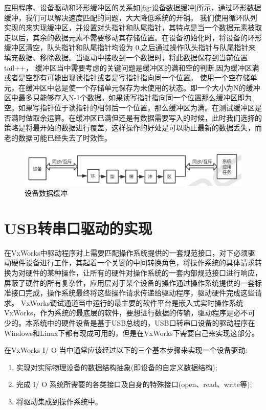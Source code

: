 	
  应用程序、设备驱动和环形缓冲区的关系如\autoref{fig:设备数据缓冲}所示，通过环形数据缓冲，我们可以解决速度匹配的问题，大大降低系统的开销。
	我们使用循环队列实现的来实现缓冲区，并设置对头指针和队尾指针，其特点是当一个数据元素被取走以后，其余的数据元素不需要移动其存储位置。在设备初始化时，将设备的环形缓冲区清空，队头指针和队尾指针均设为 0,之后通过操作队头指针与队尾指针来填充数据、移除数据。当驱动中接收到一个数据时，将此数据保存到当前位置 tail++，
	缓冲区当中需要考虑的关键问题是缓冲区的满和空的判断,因为缓冲区满或者是空都有可能出现读指针或者是写指针指向同一个位置。 使用一个空存储单元，在缓冲区中总是使一个存储单元保存为未使用的状态。即一个大小为N的缓冲区中最多只能够存入N-1个数据。如果读写指针指向同一个位置那么缓冲区即为空。如果写指针位于读指针的相邻后一个位置，那么缓冲区为满。在测试缓冲区是否满时做取余运算。在缓冲区已满但还是有数据需要写入的时候，此时我们选择的策略是将最开始的数据进行覆盖，这样操作的好处是可以防止最新的数据丢失，而老的数据可能已经失去了时效性。

\begin{figure}[!h]
\centering
\includegraphics[width=.9\textwidth]{./graphics/Dev-Data-Buf.pdf}
\caption{设备数据缓冲}\label{fig:设备数据缓冲}
\end{figure}


\section{USB转串口驱动的实现}
	在VxWorks中驱动程序对上需要匹配操作系统提供的一套规范接口，对下必须驱动硬件设备进行工作，其起着一个关键的中间转换角色，将操作系统的具体请求转换为对硬件的某种操作，让所有的硬件对操作系统的一套内部规范接口进行响应，屏蔽了硬件的所有复杂性，应用层对于某个设备的操作通过操作系统提供的一套标准接口完成，操作系统最终将这些操作请求传递给驱动程序，驱动硬件完成这些请求。	
	VxWorks调试通道当中运行的最主要的软件平台是嵌入式实时操作系统VxWorks，作为系统的最底层的软件，要想进行数据的传输，驱动程序是必不可少的。本系统中的硬件设备是基于USB总线的，USB口转串口设备的驱动程序在Windows和Linux下都有现成可用的，但是在VxWorks下需要自己来实现这部分。
	
	在VxWorks I/ O 当中通常应该经过以下的三个基本步骤来实现一个设备驱动:
\begin{enumerate}
\item 实现对实际物理设备的数据结构抽象(即设备的自定义数据结构);
\item 完成 I/ O 系统所需要的各类接口及自身的特殊接口(open、read、write等);
\item 将驱动集成到操作系统中。
\end{enumerate}

